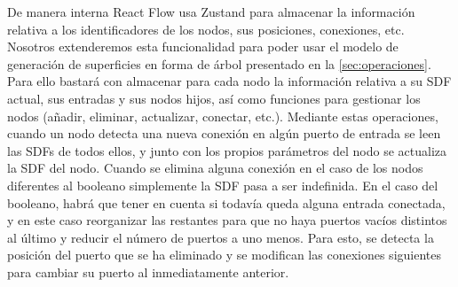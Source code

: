 De manera interna React Flow usa Zustand para almacenar la información relativa a los identificadores de los nodos, sus posiciones, conexiones, etc. Nosotros extenderemos esta funcionalidad para poder usar el modelo de generación de superficies en forma de árbol presentado en la \autoref{sec:operaciones}. Para ello bastará con almacenar para cada nodo la información relativa a su SDF actual, sus entradas y sus nodos hijos, así como funciones para gestionar los nodos (añadir, eliminar, actualizar, conectar, etc.). Mediante estas operaciones, cuando un nodo detecta una nueva conexión en algún puerto de entrada se leen las SDFs de todos ellos, y junto con los propios parámetros del nodo se actualiza la SDF del nodo. Cuando se elimina alguna conexión en el caso de los nodos diferentes al booleano simplemente la SDF pasa a ser indefinida. En el caso del booleano, habrá que tener en cuenta si todavía queda alguna entrada conectada, y en este caso reorganizar las restantes para que no haya puertos vacíos distintos al último y reducir el número de puertos a uno menos. Para esto, se detecta la posición del puerto que se ha eliminado y se modifican las conexiones siguientes para cambiar su puerto al inmediatamente anterior.\newline
